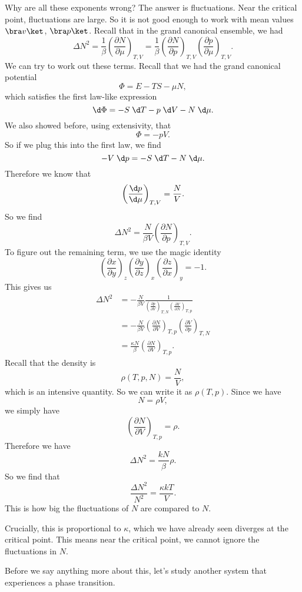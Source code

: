 \documentclass[a4paper]{article}
\begin{document}
Why are all these exponents wrong? The answer is fluctuations. Near the critical point, fluctuations are large. So it is not good enough to work with mean values $\bra v\ket$, $\bra p \ket$. Recall that in the grand canonical ensemble, we had
\[
  \Delta N^2 = \frac{1}{\beta} \left(\frac{\partial N}{\partial \mu}\right)_{T, V} = \frac{1}{\beta} \left(\frac{\partial N}{\partial p}\right)_{T, V} \left(\frac{\partial p}{\partial \mu}\right)_{T, V}.
\]
We can try to work out these terms. Recall that we had the grand canonical potential
\[
  \Phi = E - TS - \mu N,
\]
which satisfies the first law-like expression
\[
  \d \Phi = - S\;\d T - p\;\d V - N \;\d \mu.
\]
We also showed before, using extensivity, that
\[
  \Phi = - p V.
\]
So if we plug this into the first law, we find
\[
  -V \;\d p = - S\;\d T - N \;\d \mu.
\]
Therefore we know that
\[
  \left(\frac{\d p}{\d \mu}\right)_{T, V} = \frac{N}{V}.
\]
So we find
\[
  \Delta N^2 = \frac{N}{\beta V} \left(\frac{\partial N}{\partial p}\right)_{T, V}.
\]
To figure out the remaining term, we use the magic identity
\[
  \left(\frac{\partial x}{\partial y}\right)_z \left(\frac{\partial y}{\partial z}\right)_x \left(\frac{\partial z}{\partial x}\right)_y = -1.
\]
This gives us
\begin{align*}
  \Delta N^2 &=- \frac{N}{\beta V} \frac{1}{ \left(\frac{\partial p}{\partial V}\right)_{T, N} \left(\frac{\partial V}{\partial N}\right)_{T, p}} \\
  &= -\frac{N}{\beta V}\left(\frac{\partial N}{\partial V}\right)_{T, p} \left(\frac{\partial V}{\partial p}\right)_{T, N}\\
  &= \frac{\kappa N}{\beta}\left(\frac{\partial N}{\partial V}\right)_{T, p}.
\end{align*}
Recall that the density is
\[
  \rho (T, p, N) = \frac{N}{V},
\]
which is an intensive quantity. So we can write it as $\rho(T, p)$. Since we have
\[
  N = \rho V,
\]
we simply have
\[
  \left(\frac{\partial N}{\partial V}\right)_{T, p} = \rho.
\]
Therefore we have
\[
  \Delta N^2 = \frac{k N}{\beta} \rho.
\]
So we find that
\[
  \frac{\Delta N^2}{N^2} = \frac{\kappa kT}{V}.
\]
This is how big the fluctuations of $N$ are compared to $N$.

Crucially, this is proportional to $\kappa$, which we have already seen diverges at the critical point. This means near the critical point, we cannot ignore the fluctuations in $N$.

Before we say anything more about this, let's study another system that experiences a phase transition.
\end{document}

